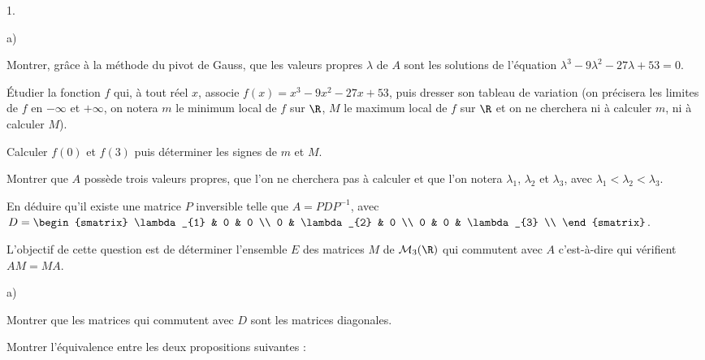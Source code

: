 \documentclass[11pt]{article}%
\begin{document}
\begin{noliste}{1.}
 \setlength{\itemsep}{4mm}

\item \begin{noliste}{a)}
 \setlength{\itemsep}{2mm}

\item Montrer, grâce à la méthode du pivot de Gauss, que les valeurs
propres $\lambda$ de $A$ sont les solutions de l'équation $\lambda^{3}
- 9 \lambda^{2} - 27 \lambda + 53 = 0$. 

\item Étudier la fonction $f$ qui, à tout réel $x$, associe $f(x) =
x^{3} - 9 x^{2} - 27 x + 53$, puis dresser son tableau de variation (on
précisera les limites de $f$ en $-\infty$ et $ + \infty$, on notera $m$
le minimum local de $f$ sur $\R$, $M$ le maximum local de $f$ sur $\R$
et on ne cherchera ni à calculer $m$, ni à calculer $M$).

\item Calculer $f(0)$ et $f(3)$ puis déterminer les signes de $m$ et
$M$.

\item Montrer que $A$ possède trois valeurs propres, que l'on ne
cherchera pas à calculer et que l'on notera $\lambda_{1}$,
$\lambda_{2}$ et $\lambda_{3}$, avec $\lambda_{1} < \lambda_{2} <
\lambda_{3}$.

\item En déduire qu'il existe une matrice $P$ inversible telle que $A =
P D P^{-1}$, avec $D = \begin{smatrix}
\lambda_{1} & 0 & 0 \\
0 & \lambda_{2} & 0 \\
0 & 0 & \lambda_{3} \\
\end{smatrix}
$.

\end{noliste}

\item L'objectif de cette question est de déterminer l'ensemble $E$ des
matrices $M$ de $\mathcal{M}_{3} (\R)$ qui commutent avec $A$
c'est-à-dire qui vérifient $A M = MA$.

\begin{noliste}{a)}
 \setlength{\itemsep}{2mm}

\item Montrer que les matrices qui commutent avec $D$ sont les matrices
diagonales. 

\item Montrer l'équivalence entre les deux propositions suivantes : 


\end{noliste}
\end{noliste}
\end{document}
